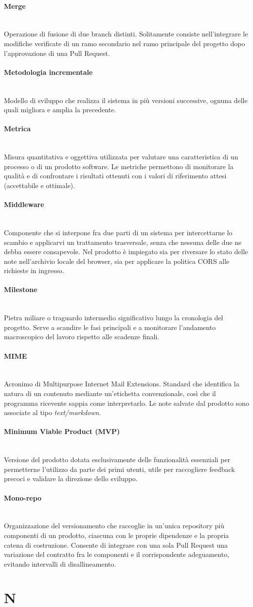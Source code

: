 \documentclass[a4paper, 10pt, colorlinks=true, linkcolor=black, urlcolor=blue, citecolor=blue, hidelinks]{article}
\newcommand{\glossaryterm}[2]{
    \paragraph{#1 \label{term:#1}} \mbox{} \\
    #2
    \vspace{0.5em}
}
\begin{document}
\glossaryterm{Merge}{Operazione di fusione di due branch distinti. Solitamente consiste nell'integrare le modifiche verificate di un ramo secondario nel ramo principale del progetto dopo l'approvazione di una Pull Request.}

\glossaryterm{Metodologia incrementale}{Modello di sviluppo che realizza il sistema in più versioni successive, ognuna delle quali migliora e amplia la precedente.}

\glossaryterm{Metrica}{Misura quantitativa e oggettiva utilizzata per valutare una caratteristica di un processo o di un prodotto software. Le metriche permettono di monitorare la qualità e di confrontare i risultati ottenuti con i valori di riferimento attesi (accettabile e ottimale).}

\glossaryterm{Middleware}{Componente che si interpone fra due parti di un sistema per intercettarne lo scambio e applicarvi un trattamento trasversale, senza che nessuna delle due ne debba essere consapevole. Nel prodotto è impiegato sia per riversare lo stato delle note nell'archivio locale del browser, sia per applicare la politica CORS alle richieste in ingresso.}

\glossaryterm{Milestone}{Pietra miliare o traguardo intermedio significativo lungo la cronologia del progetto. Serve a scandire le fasi principali e a monitorare l'andamento macroscopico del lavoro rispetto alle scadenze finali.}

\glossaryterm{MIME}{Acronimo di Multipurpose Internet Mail Extensions. Standard che identifica la natura di un contenuto mediante un'etichetta convenzionale, così che il programma ricevente sappia come interpretarlo. Le note salvate dal prodotto sono associate al tipo \textit{text/markdown}.}

\glossaryterm{Minimum Viable Product (MVP)}{Versione del prodotto dotata esclusivamente delle funzionalità essenziali per permetterne l'utilizzo da parte dei primi utenti, utile per raccogliere feedback precoci e validare la direzione dello sviluppo.}

\glossaryterm{Mono-repo}{Organizzazione del versionamento che raccoglie in un'unica repository più componenti di un prodotto, ciascuna con le proprie dipendenze e la propria catena di costruzione. Consente di integrare con una sola Pull Request una variazione del contratto fra le componenti e il corrispondente adeguamento, evitando intervalli di disallineamento.}

\newpage

\section*{N}
\end{document}

